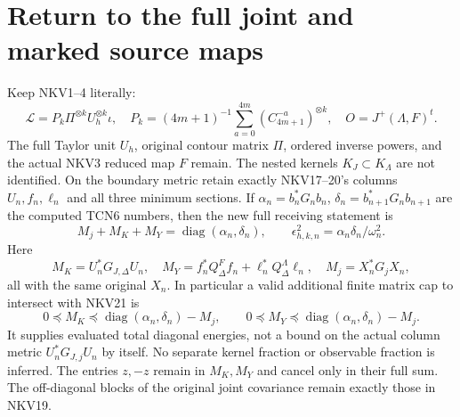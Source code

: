 \documentclass[11pt,a4paper]{article}
\begin{document}
\section{Return to the full joint and marked source maps}

Keep NKV1--4 literally:
\[
 \mathscr L=P_k\Pi^{\otimes k}U_h^{\otimes k}\iota,
 \quad P_k=(4m+1)^{-1}\sum_{a=0}^{4m}(C_{4m+1}^{-a})^{\otimes k},
 \quad O=J^+(\Lambda,F)^t.
\]
The full Taylor unit $U_h$, original contour matrix $\Pi$, ordered
inverse powers, and the actual NKV3 reduced map $F$ remain.
The nested kernels $K_J\subset K_\Lambda$ are not identified.
On the boundary metric retain exactly NKV17--20's columns
$U_n,f_n,\ell_n$ and all three minimum sections. If
$\alpha_n=b_n^*G_nb_n$, $\delta_n=b_{n+1}^*G_nb_{n+1}$ are the
computed TCN6 numbers, then the new full receiving statement is
\begin{equation}\tag{TCN32}\label{tcn:receiver}
 \boxed{M_j+M_K+M_Y=\operatorname{diag}(\alpha_n,\delta_n),\qquad
 \epsilon_{h,k,n}^2=\alpha_n\delta_n/\omega_n^2.}
\end{equation}
Here
\[
 M_K=U_n^*G_{J,\Delta}U_n,\quad
 M_Y=f_n^*Q_\Delta^Ff_n+\ell_n^*Q_\Delta^\Lambda\ell_n,
 \quad M_j=X_n^*G_jX_n,
\]
all with the same original $X_n$. In particular a valid additional
finite matrix cap to intersect with NKV21 is
\begin{equation}\tag{TCN33}
 0\preceq M_K\preceq
       \operatorname{diag}(\alpha_n,\delta_n)-M_j,
 \qquad
 0\preceq M_Y\preceq
       \operatorname{diag}(\alpha_n,\delta_n)-M_j.
\end{equation}
It supplies evaluated total diagonal energies, not a bound on the
actual column metric $U_n^*G_{J,j}U_n$ by itself. No separate kernel
fraction or observable fraction is inferred. The entries $z,-z$ remain
in $M_K,M_Y$ and cancel only in their full sum. The off-diagonal
blocks of the original joint covariance remain exactly those in NKV19.
\end{document}
